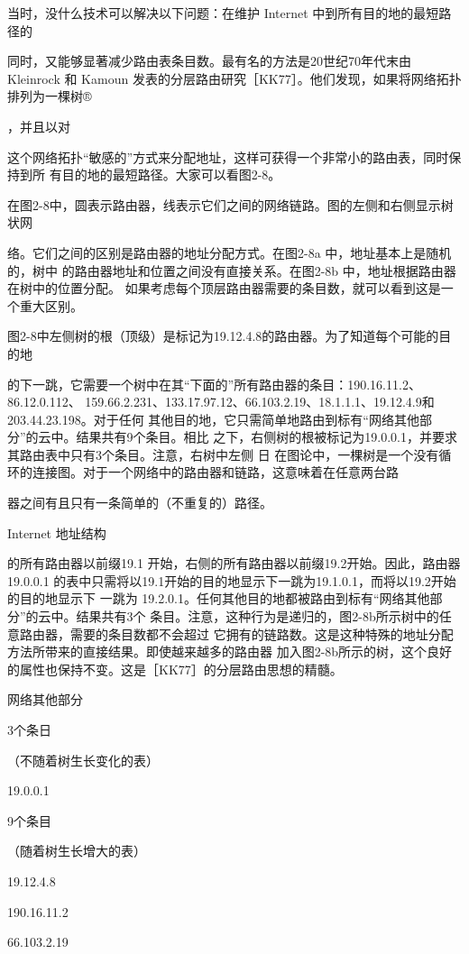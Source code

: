 当时，没什么技术可以解决以下问题：在维护 Internet 中到所有目的地的最短路径的

同时，又能够显著减少路由表条目数。最有名的方法是20世纪70年代末由 Kleinrock 和
Kamoun 发表的分层路由研究［KK77］。他们发现，如果将网络拓扑排列为一棵树®

，并且以对

这个网络拓扑“敏感的”方式来分配地址，这样可获得一个非常小的路由表，同时保持到所
有目的地的最短路径。大家可以看图2-8。

在图2-8中，圆表示路由器，线表示它们之间的网络链路。图的左侧和右侧显示树状网

络。它们之间的区别是路由器的地址分配方式。在图2-8a 中，地址基本上是随机的，树中
的路由器地址和位置之间没有直接关系。在图2-8b 中，地址根据路由器在树中的位置分配。
如果考虑每个顶层路由器需要的条目数，就可以看到这是一个重大区别。

图2-8中左侧树的根（顶级）是标记为19.12.4.8的路由器。为了知道每个可能的目的地

的下一跳，它需要一个树中在其“下面的”所有路由器的条目：190.16.11.2、86.12.0.112、
159.66.2.231、133.17.97.12、66.103.2.19、18.1.1.1、19.12.4.9和 203.44.23.198。对于任何
其他目的地，它只需简单地路由到标有“网络其他部分”的云中。结果共有9个条目。相比
之下，右侧树的根被标记为19.0.0.1，并要求其路由表中只有3个条目。注意，右树中左侧
日 在图论中，一棵树是一个没有循环的连接图。对于一个网络中的路由器和链路，这意味着在任意两台路

器之间有且只有一条简单的（不重复的）路径。

Internet 地址结构

的所有路由器以前缀19.1 开始，右侧的所有路由器以前缀19.2开始。因此，路由器 19.0.0.1
的表中只需将以19.1开始的目的地显示下一跳为19.1.0.1，而将以19.2开始的目的地显示下
一跳为 19.2.0.1。任何其他目的地都被路由到标有“网络其他部分”的云中。结果共有3个
条目。注意，这种行为是递归的，图2-8b所示树中的任意路由器，需要的条目数都不会超过
它拥有的链路数。这是这种特殊的地址分配方法所带来的直接结果。即使越来越多的路由器
加入图2-8b所示的树，这个良好的属性也保持不变。这是［KK77］的分层路由思想的精髓。

网络其他部分

3个条日

（不随着树生长变化的表）

19.0.0.1

9个条目

（随着树生长增大的表）

19.12.4.8

190.16.11.2

66.103.2.19

